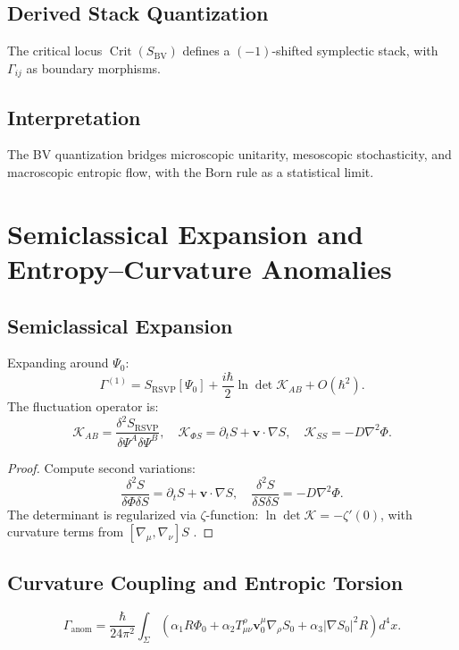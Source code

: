 \documentclass[12pt]{article}
\begin{document}
\subsection{Derived Stack Quantization}

The critical locus \(\operatorname{Crit}(S_{\mathrm{BV}})\) defines a \((-1)\)-shifted symplectic stack, with \(\Gamma_{ij}\) as boundary morphisms.

\subsection{Interpretation}

The BV quantization bridges microscopic unitarity, mesoscopic stochasticity, and macroscopic entropic flow, with the Born rule as a statistical limit.

\section{Semiclassical Expansion and Entropy–Curvature Anomalies}
\label{app:semiclassical}

\subsection{Semiclassical Expansion}

Expanding around \(\Psi_0\):
\[
\Gamma^{(1)} = S_{\mathrm{RSVP}}[\Psi_0] + \frac{i \hbar}{2} \ln \det \mathcal{K}_{AB} + O(\hbar^2).
\]
The fluctuation operator is:
\[
\mathcal{K}_{AB} = \frac{\delta^2 S_{\mathrm{RSVP}}}{\delta \Psi^A \delta \Psi^B}, \quad \mathcal{K}_{\Phi S} = \partial_t S + \mathbf{v} \cdot \nabla S, \quad \mathcal{K}_{S S} = -D \nabla^2 \Phi.
\]

\begin{proof}
Compute second variations:
\[
\frac{\delta^2 S}{\delta \Phi \delta S} = \partial_t S + \mathbf{v} \cdot \nabla S, \quad \frac{\delta^2 S}{\delta S \delta S} = -D \nabla^2 \Phi.
\]
The determinant is regularized via \(\zeta\)-function: \(\ln \det \mathcal{K} = -\zeta'(0)\), with curvature terms from \([\nabla_\mu, \nabla_\nu] S\) \citep{Pantev2013}.
\end{proof}

\subsection{Curvature Coupling and Entropic Torsion}

\[
\Gamma_{\mathrm{anom}} = \frac{\hbar}{24 \pi^2} \int_\Sigma \left( \alpha_1 R \Phi_0 + \alpha_2 T_{\mu\nu}^{\rho} \mathbf{v}_0^\mu \nabla_\rho S_0 + \alpha_3 |\nabla S_0|^2 R \right) d^4x.
\]
\end{document}
